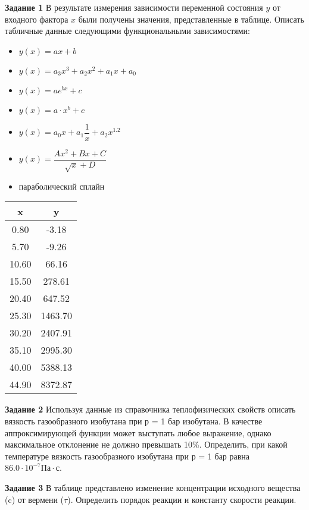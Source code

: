 \textbf{Задание 1} В результате измерения зависимости переменной состояния $y$ от входного фактора $x$ были получены значения, представленные в таблице. Описать табличные данные следующими функциональными зависимостями:
 \begin{itemize} 
\item $y(x)=a x+b$
\item $y(x)=a_3 x^3 +a_2 x^2 + a_1 x +a_0$
\item $y(x)=a e^{b x}+c  $
\item $y(x)=a \cdot x^b+c$
\item $y(x)=a_0 x                     +a_1 \dfrac{1}{x}           +a_2 x^{1.2}               $
\item $y(x)=\dfrac{A x^2 + B x +C}{\sqrt{x} +D}$
\item параболический сплайн
\end{itemize}
\begin{table}[h]
\begin{tabular}{|c|c|}
\hline
x & y \\ \hline
 0.80 &      -3.18 \\ \hline 
 5.70 &      -9.26 \\ \hline 
10.60 &      66.16 \\ \hline 
15.50 &     278.61 \\ \hline 
20.40 &     647.52 \\ \hline 
25.30 &    1463.70 \\ \hline 
30.20 &    2407.91 \\ \hline 
35.10 &    2995.30 \\ \hline 
40.00 &    5388.13 \\ \hline 
44.90 &    8372.87 \\ \hline 
\end{tabular}
\end{table}

\textbf{Задание 2}  Используя данные из справочника теплофизических свойств описать вязкость газообразного изобутана при р = 1 бар изобутана. В качестве аппроксимирующей функции может выступать любое выражение, однако максимальное отклонение не должно превышать 10\%. Определить, при какой температуре вязкость газообразного изобутана при р = 1 бар равна $    86.0 \cdot 10^{-7} \text{Па} \cdot \text{с}$.

\textbf{Задание 3} В таблице представлено изменение концентрации исходного вещества (c) от вермени ($\tau$). Определить порядок реакции и константу скорости реакции.

